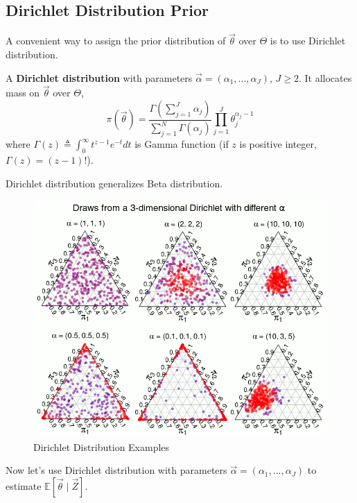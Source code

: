 \documentclass[11pt]{elegantbook}
\begin{document}
\subsection{Dirichlet Distribution Prior}
A convenient way to assign the prior distribution of $\vec{\theta}$ over $\Theta$ is to use Dirichlet distribution.
\begin{definition}
    \normalfont
    A \textbf{Dirichlet distribution} with parameters $\vec{\alpha}=(\alpha_1,...,\alpha_J)$, $J\geq 2$.
    It allocates mass on $\vec{\theta}$ over $\Theta$,
    $$\pi(\vec{\theta})=\frac{\Gamma(\sum_{j=1}^J \alpha_j)}{\sum_{j=1}^N\Gamma(\alpha_j)}\prod_{j=1}^J\theta_j^{\alpha_j-1}$$
    where $\Gamma(z)\triangleq\int_0^\infty t^{z-1}e^{-t}dt$ is Gamma function (if $z$ is positive integer, $\Gamma(z)=(z-1)!$).
    \begin{note}
        Dirichlet distribution generalizes Beta distribution.
    \end{note}
\end{definition}
\begin{figure}[htbp]
    \centering
    \includegraphics[scale=0.4]{dirichlet_plot.png}
    \caption{Dirichlet Distribution Examples}
    \label{}
\end{figure}

Now let's use Dirichlet distribution with parameters $\vec{\alpha}=(\alpha_1,...,\alpha_J)$ to estimate $\mathbb{E}[\vec{\theta}\mid \vec{Z}]$.
\end{document}

